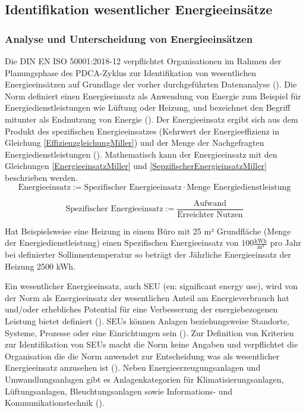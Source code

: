 \subsection{Identifikation wesentlicher Energieeinsätze}

\subsubsection{Analyse und Unterscheidung von Energieeinsätzen}

Die DIN EN ISO 50001:2018-12 verpflichtet Organisationen im Rahmen der Planungsphase des PDCA-Zyklus zur Identifikation von wesentlichen Energieeinsätzen auf Grundlage 
der vorher durchgeführten Datenanalyse (\cite[S. 25]{DIN50001.2018}).
Die Norm definiert einen Energieeinsatz als Anwendung von Energie zum Beispiel für Energiedienstleistungen wie Lüftung oder Heizung, und bezeichnet den Begriff mitunter als 
Endnutzung von Energie (\cite[Kapitel 3.5.4]{DIN50001.2018}). 
Der Energieeinsatz ergibt sich aus dem Produkt des spezifischen Energieeinsatzes (Kehrwert der Energieeffizienz in Gleichung \eqref{EffizienzgleichungMiller}) 
und der Menge der Nachgefragten Energiedienstleistungen (\cite[S. 120]{Miller.2016}).
Mathematisch kann der Energieeinsatz mit den Gleichungen \eqref{EnergieeinsatzMiller} und \eqref{SepzifischerEnergieinsatzMiller} beschrieben werden.
\begin{equation}
    \text{Energieeinsatz} := \text{Spezifischer Energieeinsatz} \cdot \text{Menge Energiedienstleistung}
    \label{EnergieeinsatzMiller}
\end{equation}

\begin{equation}
    \text{Spezifischer Energieeinsatz} :=\frac{\text{Aufwand}}{\text{Erreichter Nutzen}}
    \label{SepzifischerEnergieinsatzMiller}
\end{equation}

Hat Beispielsweise eine Heizung in einem Büro mit 25 m² Grundfläche (Menge der Energiedienstleistung) einen Spezifischen Energieeinsatz von $100 \frac{\text{kWh}}{\text{m²}}$ pro Jahr 
bei definierter Sollinnentemperatur so beträgt der Jährliche Energieeinsatz der Heizung 2500 kWh.

Ein wesentlicher Energieeinsatz, auch SEU (en: significant energy use), wird von der Norm als Energieeinsatz der wesentlichen Anteil am Energieverbrauch 
hat und/oder erhebliches Potential für eine Verbesserung der energiebezogenen Leistung bietet definiert (\cite[Kapitel 3.5.6]{DIN50001.2018}). 
SEUs können Anlagen beziehungsweise Standorte, Systeme, Prozesse oder eine Einrichtungen sein (\cite[Kapitel 3.5.6]{DIN50001.2018}).
Zur Definition von Kriterien zur Identifikation von SEUs macht die Norm keine Angaben und verpflichtet die Organisation die die Norm anwendet zur Entscheidung was 
als wesentlicher Energieeinsatz anzusehen ist (\cite[S. 38]{DIN50001.2018}). 
Neben Energieerzeugungsanlagen und Umwandlungsanlagen gibt es Anlagenkategorien für Klimatisierungsanlagen, 
Lüftungsanlagen, Bleuchtungsanlagen sowie Informations- und Kommunikationstechnik (\cite[S. 14]{Hohnhold.2013}).

